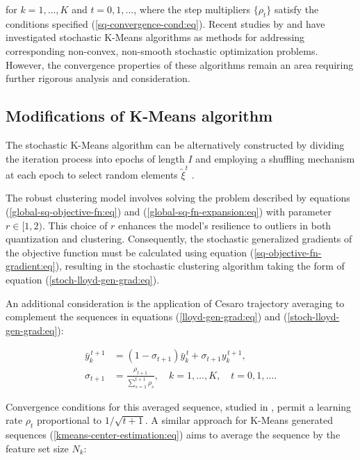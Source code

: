 \noindent for $k=1,\ldots,K$ and $t=0,1,\ldots$, where the step multipliers $\{\rho_t\}$ satisfy the conditions specified (\ref{sq-convergence-cond:eq}). Recent studies by \cite{Tang_2017} and \cite{Zhao_Lan_Chen_Ngo_2021} have investigated stochastic K-Means algorithms as methods for addressing corresponding non-convex, non-smooth stochastic optimization problems. However, the convergence properties of these algorithms remain an area requiring further rigorous analysis and consideration.

\subsection{Modifications of K-Means algorithm}

The stochastic K-Means algorithm can be alternatively constructed by dividing the iteration process into epochs of length $I$ and employing a shuffling mechanism at each epoch to select random elements $\tilde{\xi}^t$ \cite{bottou2009curiously,montavon2012neural}. 

The robust clustering model involves solving the problem described by equations (\ref{global-sq-objective-fn:eq}) and (\ref{global-sq-fn-expansion:eq}) with parameter $r \in [1,2)$. This choice of $r$ enhances the model's resilience to outliers in both quantization and clustering. Consequently, the stochastic generalized gradients of the objective function must be calculated using equation (\ref{sq-objective-fn-gradient:eq}), resulting in the stochastic clustering algorithm taking the form of equation (\ref{stoch-lloyd-gen-grad:eq}).

An additional consideration is the application of Cesaro trajectory averaging \cite{Bottou_Curtis_Nocedal_2018,montavon2012neural} to complement the sequences in equations (\ref{lloyd-gen-grad:eq}) and (\ref{stoch-lloyd-gen-grad:eq}):

\begin{equation}
    \label{kmeans-trajectory-avg:eq}
    \begin{aligned}
        \bar{y}_k^{\,t+1} &= (1 - \sigma_{t+1}) \bar{y}_k^{\,t} + \sigma_{t+1} y_k^{\,t+1}, \\
        \sigma_{t+1} &= \frac{\rho_{t+1}}{\sum_{s=1}^{t+1} \rho_{s}}, \quad k = 1, \ldots, K, \quad t=0,1,\ldots.
    \end{aligned}
\end{equation}

Convergence conditions for this averaged sequence, studied in \cite{mikhalevich2024}, permit a learning rate $\rho_t$ proportional to $1 / \sqrt{t+1}$. A similar approach for K-Means generated sequences (\ref{kmeans-center-estimation:eq}) aims to average the sequence by the feature set size $N_k$:

